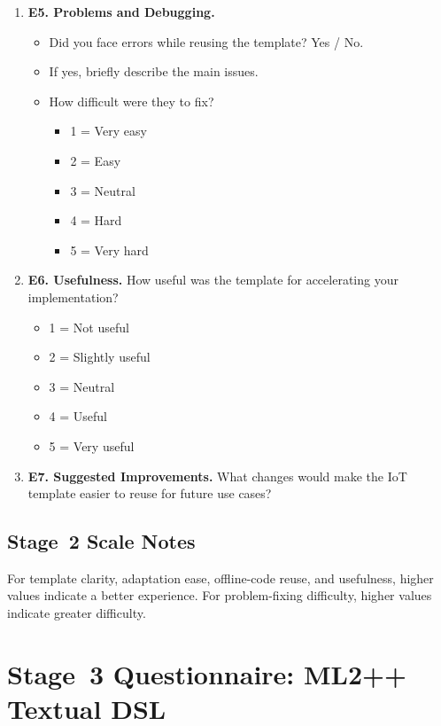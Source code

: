 \begin{enumerate}[leftmargin=*]
    \item \textbf{E5. Problems and Debugging.}
    \begin{itemize}
        \item Did you face errors while reusing the template? Yes / No.
        \item If yes, briefly describe the main issues.
        \item How difficult were they to fix?
        \begin{itemize}
            \item 1 = Very easy
            \item 2 = Easy
            \item 3 = Neutral
            \item 4 = Hard
            \item 5 = Very hard
        \end{itemize}
    \end{itemize}

    \item \textbf{E6. Usefulness.}
    How useful was the template for accelerating your implementation?
    \begin{itemize}
        \item 1 = Not useful
        \item 2 = Slightly useful
        \item 3 = Neutral
        \item 4 = Useful
        \item 5 = Very useful
    \end{itemize}

    \item \textbf{E7. Suggested Improvements.}
    What changes would make the IoT template easier to reuse for future use cases?
\end{enumerate}

\subsection{Stage~2 Scale Notes}
\label{app:stage2_scale_notes}

For template clarity, adaptation ease, offline-code reuse, and usefulness, higher values indicate a better experience. For problem-fixing difficulty, higher values indicate greater difficulty.

\section{Stage~3 Questionnaire: ML2++ Textual DSL}
\label{app:stage3_questionnaire}

